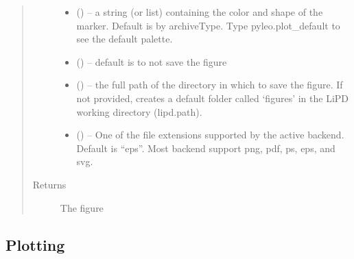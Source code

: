 \documentclass[letterpaper,10pt,english]{sphinxmanual}
\begin{document}
\begin{fulllineitems}
\begin{quote}
\begin{description}
\begin{itemize}
\item {} 
 () -- a string (or list) containing the color and shape of the
marker. Default is by archiveType. Type pyleo.plot\_default to see
the default palette.

\item {} 
 () -- default is to not save the figure

\item {} 
 () -- the full path of the directory in which to save the figure.
If not provided, creates a default folder called `figures' in the
LiPD working directory (lipd.path).

\item {} 
 () -- One of the file extensions supported by the active
backend. Default is ``eps''. Most backend support png, pdf, ps, eps,
and svg.

\end{itemize}

\item[{Returns}] \leavevmode
The figure

\end{description}\end{quote}

\end{fulllineitems}



\subsection{Plotting}
\label{\detokenize{Main:plotting}}
\end{document}

